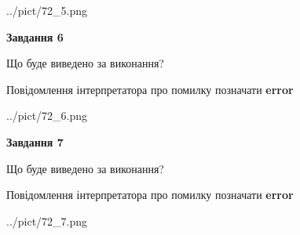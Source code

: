 \documentclass[10pt, ukrainian]{article}
\begin{document}
{\begin {large}
\begin{center}
	{../pict/72_5.png}
\end{center}
\newpage

{\begin {center}\textbf{Завдання 6}\end {center}}\par
Що буде виведено за виконання? \par
Повідомлення інтерпретатора про помилку позначати \textbf{error}

\begin{center}
	{../pict/72_6.png}
\end{center}
\newpage

{\begin {center}\textbf{Завдання 7}\end {center}}\par
Що буде виведено за виконання? \par
Повідомлення інтерпретатора про помилку позначати \textbf{error}

\begin{center}
	{../pict/72_7.png}
\end{center}
\newpage

\end {large}}
\end{document}
